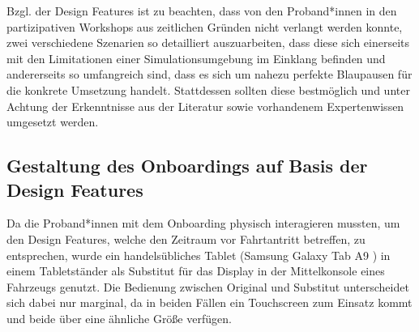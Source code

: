 Bzgl. der Design Features ist zu beachten, dass von den Proband*innen in den partizipativen Workshops aus zeitlichen Gründen nicht verlangt werden konnte, zwei verschiedene Szenarien so detailliert auszuarbeiten, dass diese sich einerseits mit den Limitationen einer Simulationsumgebung im Einklang befinden und andererseits so umfangreich sind, dass es sich um nahezu perfekte Blaupausen für die konkrete Umsetzung handelt. Stattdessen sollten diese bestmöglich und unter Achtung der Erkenntnisse aus der Literatur sowie vorhandenem Expertenwissen umgesetzt werden. 

\subsection{Gestaltung des Onboardings auf Basis der Design Features}
\label{subsec:Gestaltung_Onboarding}

Da die Proband*innen mit dem Onboarding physisch interagieren mussten, um den Design Features, welche den Zeitraum vor Fahrtantritt betreffen, zu entsprechen, wurde ein handelsübliches Tablet (Samsung Galaxy Tab A9 \cite{samsung2023galaxytaba9}) in einem Tabletständer als Substitut für das Display in der Mittelkonsole eines Fahrzeugs genutzt. Die Bedienung zwischen Original und Substitut unterscheidet sich dabei nur marginal, da in beiden Fällen ein Touchscreen zum Einsatz kommt und beide über eine ähnliche Größe verfügen. 

